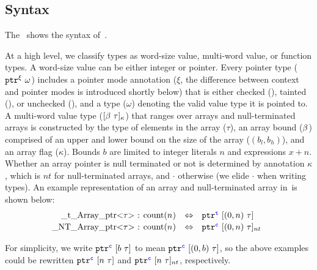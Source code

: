 
\subsection{Syntax}\label{sec:syntax}
The~ shows the syntax of~\lang.

At a high level, we classify types as word-size value, multi-word
value, or function types. A word-size value can be either integer or pointer.
Every pointer type ($\mathtt{ptr}^{\xi}~{\omega}$) includes a
pointer mode annotation ($\xi$, the difference between context and pointer modes
is introduced shortly below) that is either checked (\cmode), tainted (\tmode),
or unchecked (\umode), and a type ($\omega$) denoting the valid value type it is pointed to.
A multi-word value type ($ [{\beta}~{\tau}]_{\kappa}$) that ranges over 
arrays and null-terminated arrays is constructed by the type of elements in the
array ($\tau$), an array bound ($\beta$) comprised of an upper and
lower bound on the size of the array ($(b_l,b_h)$), and an array flag ($\kappa$).
Bounds $b$ are
limited to integer literals $n$ and expressions $x + n$.
Whether an array pointer is null terminated or not is determined by annotation
$\kappa$, which is $nt$ for null-terminated arrays, and $\cdot$
otherwise (we elide $\cdot$ when writing types).
An example representation of an array and null-terminated array in~\lang is shown below:
% 
\[\hspace*{-0.5em}
\begin{array}{l}
\begin{array}{rcl}
$\code{_t_Array_ptr<}$\tau$\code{> : count(}$n$\code{)}$
&\Leftrightarrow& \tarrayptr{0}{n}{\tau}{\tmode}
\\[0.2em]
$\code{_NT_Array_ptr<}$\tau$\code{> : count(}$n$\code{)}$
&\Leftrightarrow& \tntarrayptr{0}{n}{\tau}{\cmode}
\end{array}
\end{array}
\]

For simplicity, we write
$\mathtt{ptr}^{\textcolor{blue}{\texttt{c}}}~{[{b}~{\tau}]}$ to mean $\mathtt{ptr}^{\textcolor{blue}{\texttt{c}}}~{[{({0},{b})}~{\tau}]}$,
so the above examples could be rewritten $\mathtt{ptr}^{\textcolor{blue}{\texttt{c}}}~{[{n}~{\tau}]}$ and
$\mathtt{ptr}^{\textcolor{blue}{\texttt{c}}}~{[{n}~{\tau}]_{nt}}$, respectively.

